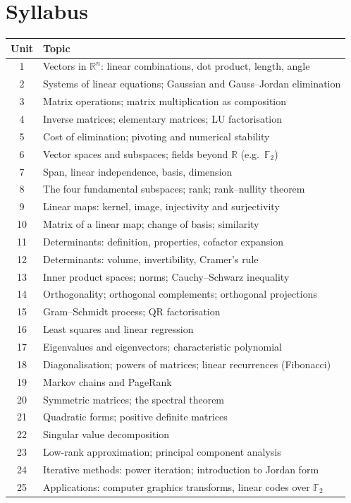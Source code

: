 \documentclass[11pt,a4paper]{article}
\begin{document}
\section{Syllabus}
\begin{tabularx}{\textwidth}{c X}
\toprule
\textbf{Unit} & \textbf{Topic} \\
\midrule
1  & Vectors in $\mathbb{R}^n$: linear combinations, dot product, length, angle \\
2  & Systems of linear equations; Gaussian and Gauss--Jordan elimination \\
3  & Matrix operations; matrix multiplication as composition \\
4  & Inverse matrices; elementary matrices; LU factorisation \\
5  & Cost of elimination; pivoting and numerical stability \\
6  & Vector spaces and subspaces; fields beyond $\mathbb{R}$ (e.g.\ $\mathbb{F}_2$) \\
7  & Span, linear independence, basis, dimension \\
8  & The four fundamental subspaces; rank; rank--nullity theorem \\
9  & Linear maps: kernel, image, injectivity and surjectivity \\
10 & Matrix of a linear map; change of basis; similarity \\
11 & Determinants: definition, properties, cofactor expansion \\
12 & Determinants: volume, invertibility, Cramer's rule \\
13 & Inner product spaces; norms; Cauchy--Schwarz inequality \\
14 & Orthogonality; orthogonal complements; orthogonal projections \\
15 & Gram--Schmidt process; QR factorisation \\
16 & Least squares and linear regression \\
17 & Eigenvalues and eigenvectors; characteristic polynomial \\
18 & Diagonalisation; powers of matrices; linear recurrences (Fibonacci) \\
19 & Markov chains and PageRank \\
20 & Symmetric matrices; the spectral theorem \\
21 & Quadratic forms; positive definite matrices \\
22 & Singular value decomposition \\
23 & Low-rank approximation; principal component analysis \\
24 & Iterative methods: power iteration; introduction to Jordan form \\
25 & Applications: computer graphics transforms, linear codes over $\mathbb{F}_2$ \\
\bottomrule
\end{tabularx}
\end{document}
